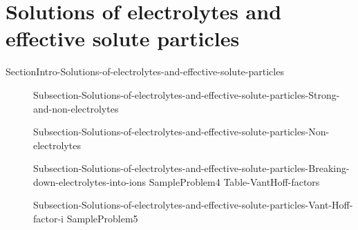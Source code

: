 \documentclass[main.tex]{subfiles}
\newcommand\chapterlabel{Ch-solutions}\setcounter{figurenewcounter}{0}\setcounter{tablenewcounter}{0}\setcounter{formulanewcounter}{0}
\begin{document}
\section{Solutions of electrolytes and effective solute particles}
{SectionIntro-Solutions-of-electrolytes-and-effective-solute-particles}
\sloppy \begin{description}
\item[] {Subsection-Solutions-of-electrolytes-and-effective-solute-particles-Strong-and-non-electrolytes}
\item[] {Subsection-Solutions-of-electrolytes-and-effective-solute-particles-Non-electrolytes}
\item[] 
{Subsection-Solutions-of-electrolytes-and-effective-solute-particles-Breaking-down-electrolytes-into-ions}
{SampleProblem4}
{Table-VantHoff-factors}
\item[] {Subsection-Solutions-of-electrolytes-and-effective-solute-particles-Vant-Hoff-factor-i}
{SampleProblem5}
\end{description}
\end{document}
